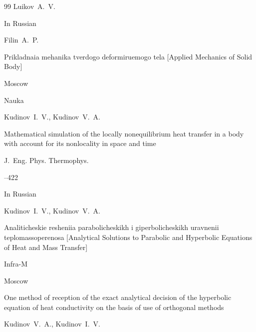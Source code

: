 \begin{thebibliography}{99}
\by  Luikov~A.~V.







\lang In Russian

\by  Filin~A.~P.

\book Prikladnaia mehanika tverdogo deformiruemogo tela \rm [Applied Mechanics of Solid Body]


\publaddr Moscow

\publ Nauka







\by  Kudinov~I.~V.,  Kudinov~V.~A.

\paper Mathematical simulation of the locally nonequilibrium heat transfer in a body with account for its nonlocality in space and time

\jour J.~Eng. Phys. Thermophys.



–422 







\lang In Russian

\by Kudinov~I.~V., Kudinov~V.~A.

\book Analiticheskie resheniia parabolicheskikh i giperbolicheskikh uravnenii teplomassoperenosa \rm [Analytical Solutions to Parabolic and Hyperbolic Equations of Heat and Mass Transfer]

\publ Infra-M

\publaddr Moscow






\paper One method of reception of the exact analytical decision of the hyperbolic equation of heat conductivity on the basis of use of orthogonal methods

\by  Kudinov~V.~A., Kudinov~I.~V. 


\end{thebibliography}
